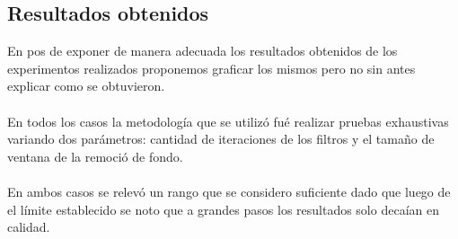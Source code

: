 \subsection{Resultados obtenidos}

En pos de exponer de manera adecuada los resultados obtenidos de los experimentos realizados proponemos graficar los mismos pero no sin antes explicar como se obtuvieron.\\
\\En todos los casos la metodolog\'ia que se utiliz\'o fu\'e realizar pruebas exhaustivas variando dos par\'ametros: cantidad de iteraciones de los filtros y el tamaño de ventana de la remoci\'o de fondo.\\
\\En ambos casos se relev\'o un rango que se considero suficiente dado que luego de el límite establecido se noto que a grandes pasos los resultados solo deca\'ian en calidad.\\

